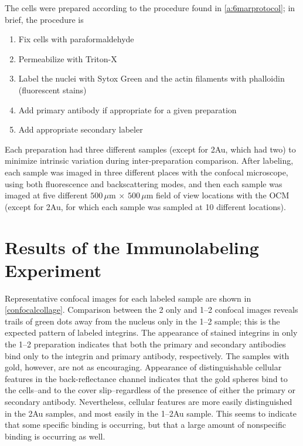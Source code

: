 The cells were prepared according to the procedure found in \autoref{a:6marprotocol}; in brief, the procedure is

\begin{enumerate}
\item Fix cells with paraformaldehyde

\item Permeabilize with Triton-X

\item Label the nuclei with Sytox Green and the actin filaments with phalloidin (fluorescent stains)

\item Add primary antibody if appropriate for a given preparation

\item Add appropriate secondary labeler

\end{enumerate}

Each preparation had three different samples (except for 2Au, which had two) to minimize intrinsic variation during inter-preparation comparison. After labeling, each sample was imaged in three different places with the confocal microscope, using both fluorescence and backscattering modes, and then each sample was imaged at five different $500\,\mu\mathrm{m}\,\times\,500\,\mu\mathrm{m}$ field of view locations with the OCM (except for 2Au, for which each sample was sampled at 10 different locations).

\section{Results of the Immunolabeling Experiment}
\label{resultsoftheimmunolabelingexperiment}

Representative confocal images for each labeled sample are shown in \autoref{confocalcollage}. Comparison between the 2 only and 1--2 confocal images reveals trails of green dots away from the nucleus only in the 1--2 sample; this is the expected pattern of labeled integrins. The appearance of stained integrins in only the 1--2 preparation indicates that both the primary and secondary antibodies bind only to the integrin and primary antibody, respectively. The samples with gold, however, are not as encouraging. Appearance of distinguishable cellular features in the back-reflectance channel indicates that the gold spheres bind to the cells--and to the cover slip--regardless of the presence of either the primary or secondary antibody. Nevertheless, cellular features are more easily distinguished in the 2Au samples, and most easily in the 1--2Au sample. This seems to indicate that some specific binding is occurring, but that a large amount of nonspecific binding is occurring as well.

